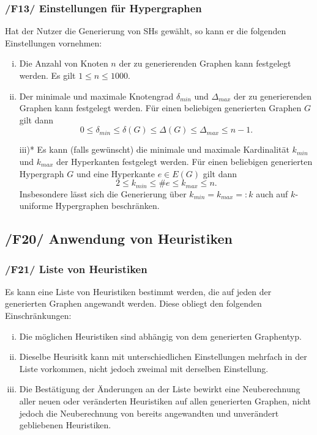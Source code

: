 \documentclass{article}
\begin{document}
	\subsubsection*{/F13/ Einstellungen für Hypergraphen} \label{f13} 
	Hat der Nutzer die Generierung von SHs gewählt, so kann er die folgenden Einstellungen vornehmen:
	\begin{enumerate}[i)]
		\item{Die Anzahl von Knoten $n$ der zu generierenden Graphen kann festgelegt werden. Es gilt $1 \leq n \leq 1000$.}
		\item{Der minimale und maximale Knotengrad $\delta_{min}$ und $\Delta_{max}$ der zu generierenden Graphen kann festgelegt werden. Für einen beliebigen generierten Graphen $G$ gilt dann $$0 \leq \delta_{min} \leq \delta(G) \leq \Delta(G) \leq \Delta_{max} \leq n-1.$$}
		\item[iii)*]{Es kann (falls gewünscht) die minimale und maximale Kardinalität $k_{min}$ und $k_{max}$ der Hyperkanten festgelegt werden. Für einen beliebigen generierten Hypergraph $G$ und eine Hyperkante $e \in E(G)$ gilt dann $$2 \leq k_{min} \leq \# e \leq k_{max} \leq n.$$ Insbesondere lässt sich die Generierung über $k_{min} = k_{max} =: k$ auch auf $k$-uniforme Hypergraphen beschränken.}
	\end{enumerate}
	
	
	\newpage
	
	\subsection*{/F20/ Anwendung von Heuristiken} \label{f20} 
	
	\subsubsection*{/F21/ Liste von Heuristiken} \label{f21} 
	Es kann eine Liste von Heuristiken bestimmt werden, die auf jeden der generierten Graphen angewandt werden. Diese obliegt den folgenden Einschränkungen:
	\begin{enumerate}[i)]
		\item{Die möglichen Heuristiken sind abhängig von dem generierten Graphentyp.}
		\item{Dieselbe Heurisitk kann mit unterschiedlichen Einstellungen mehrfach in der Liste vorkommen, nicht jedoch zweimal mit derselben Einstellung.}
		\item{Die Bestätigung der Änderungen an der Liste bewirkt eine Neuberechnung aller neuen oder veränderten Heuristiken auf allen generierten Graphen, nicht jedoch die Neuberechnung von bereits angewandten und unverändert gebliebenen Heuristiken.}
	\end{enumerate}
	
\end{document}
